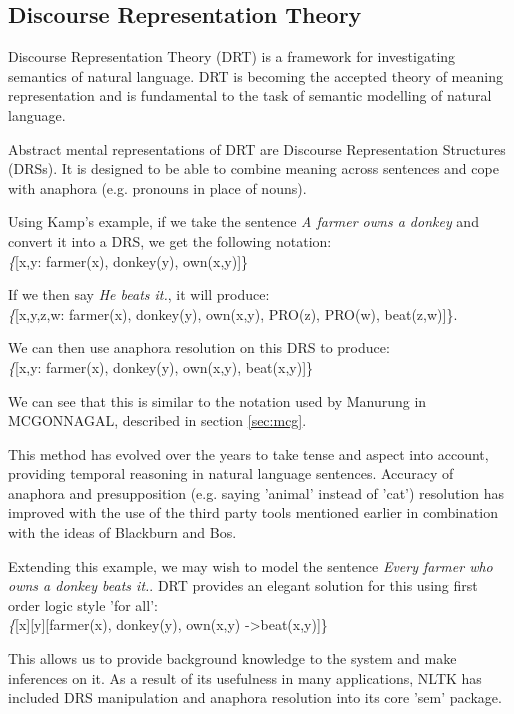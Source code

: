 
\subsection{Discourse Representation Theory}
\label{sec:drt}
Discourse Representation Theory (DRT)\cite{kamp1993discourse} is a framework for investigating semantics of natural language. DRT is becoming the accepted theory of meaning representation\cite{BasileBosEvangVenhuizen2012LREC}\cite{blackburn2008computational} and is fundamental to the task of semantic modelling of natural language.

Abstract mental representations of DRT are Discourse Representation Structures (DRSs). It is designed to be able to combine meaning across sentences and cope with anaphora (e.g. pronouns in place of nouns). 

Using Kamp's example, if we take the sentence \textit{A farmer owns a donkey} and convert it into a DRS, we get the following notation:\\
\textit\{[x,y: farmer(x), donkey(y), own(x,y)]\}

If we then say \textit{He beats it.}, it will produce:\\
\textit\{[x,y,z,w: farmer(x), donkey(y), own(x,y), PRO(z), PRO(w), beat(z,w)]\}.

We can then use anaphora resolution on this DRS to produce:\\
\textit\{[x,y: farmer(x), donkey(y), own(x,y), beat(x,y)]\}

We can see that this is similar to the notation used by Manurung in MCGONNAGAL, described in section \ref{sec:mcg}.

This method has evolved over the years to take tense and aspect into account, providing temporal reasoning in natural language sentences. Accuracy of anaphora and presupposition (e.g. saying 'animal' instead of 'cat') resolution has improved with the use of the third party tools mentioned earlier in combination with the ideas of Blackburn and Bos\cite{blackburn2008computational}.

Extending this example, we may wish to model the sentence \textit{Every farmer who owns a donkey beats it.}. DRT provides an elegant solution for this using first order logic style 'for all':\\
\textit\{[x][y][farmer(x), donkey(y), own(x,y) -\textgreater beat(x,y)]\}

This allows us to provide background knowledge to the system and make inferences on it. As a result of its usefulness in many applications, NLTK has included DRS manipulation and anaphora resolution into its core 'sem' package. 

